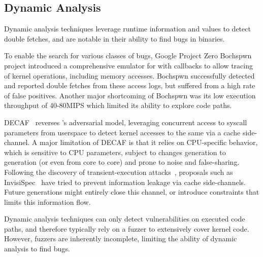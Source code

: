 \documentclass[letterpaper,twocolumn,10pt]{article}
\begin{document}
\subsection{Dynamic Analysis}

Dynamic analysis techniques leverage runtime information and values 
to detect double fetches, and are notable in their ability to 
find bugs in binaries.

To enable the search for various classes of bugs, Google Project Zero 
Bochspwn~\cite{jurczyk2013bochspwn} project introduced
a comprehensive emulator for  with callbacks to allow 
tracing of kernel operations, including memory accesses.
Bochspwn successfully detected and reported double fetches from
these access logs, but suffered from a high rate of false positives.
Another major shortcoming of Bochspwn was its low execution throughput
of 40-80MIPS which limited its ability to explore code paths.

DECAF~\cite{schwartzDECAF} reverses \tiktok's adversarial model, leveraging 
concurrent access to syscall parameters from userspace to detect kernel 
accesses to the same via a cache side-channel.
A major limitation of DECAF is that it relies on CPU-specific behavior, which 
is sensitive to CPU parameters, subject to changes generation to 
generation (or even from core to core) and prone to noise and false-sharing. 
Following the discovery of transient-execution attacks~\cite{kocher18spectre},
proposals such as InvisiSpec~\cite{YanInvisispec} have tried to prevent 
information leakage via cache side-channels.
Future generations might entirely close this channel, or introduce constraints 
that limits this information flow. 

Dynamic analysis techniques can only detect vulnerabilities on executed code 
paths, and therefore typically rely on a fuzzer to extensively cover kernel code.
However, fuzzers are inherently incomplete, limiting the ability of dynamic 
analysis to find bugs.

\end{document}
